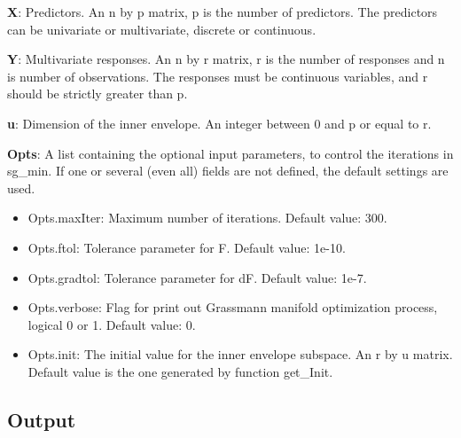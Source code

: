 \documentclass[a4paper,11pt,openany]{memoir}
\begin{document}
\begin{par}
\textbf{X}: Predictors. An n by p matrix, p is the number of predictors. The predictors can be univariate or multivariate, discrete or continuous.
\end{par} \vspace{1em}
\begin{par}
\textbf{Y}: Multivariate responses. An n by r matrix, r is the number of responses and n is number of observations. The responses must be continuous variables, and r should be strictly greater than p.
\end{par} \vspace{1em}
\begin{par}
\textbf{u}: Dimension of the inner envelope. An integer between 0 and p or equal to r.
\end{par} \vspace{1em}
\begin{par}
\textbf{Opts}: A list containing the optional input parameters, to control the iterations in sg\_min. If one or several (even all) fields are not defined, the default settings are used.
\end{par} \vspace{1em}
\begin{itemize}
\setlength{\itemsep}{-1ex}
   \item Opts.maxIter: Maximum number of iterations.  Default value: 300.
   \item Opts.ftol: Tolerance parameter for F.  Default value: 1e-10.
   \item Opts.gradtol: Tolerance parameter for dF.  Default value: 1e-7.
   \item Opts.verbose: Flag for print out Grassmann manifold optimization process, logical 0 or 1. Default value: 0.
   \item Opts.init: The initial value for the inner envelope subspace. An r by u matrix. Default value is the one generated by function get\_Init.
\end{itemize}


\subsection*{Output}
\end{document}

